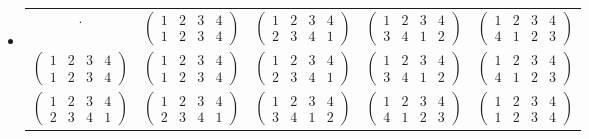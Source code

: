 \documentclass[titlepage]{article}
\newenvironment{problem}[2][Problem]{\begin{trivlist}
\item[\hskip \labelsep {\bfseries #1}\hskip \labelsep {\bfseries #2.}]}{\end{trivlist}}
\begin{document}
\begin{problem}{9}
\begin{itemize}
\item[(a)]  \begin{tabular}{c | c c c c}
    $\cdot$ & $\left(\begin{smallmatrix} 1 & 2 & 3 & 4 \\ 1 & 2 & 3 & 4\end{smallmatrix} \right)$ & $\left(\begin{smallmatrix} 1 & 2 & 3 & 4 \\ 2 & 3 & 4 & 1\end{smallmatrix}\right)$ & $\left(\begin{smallmatrix} 1 & 2 & 3 & 4 \\ 3 & 4 & 1 & 2\end{smallmatrix}\right)$ & $\left(\begin{smallmatrix} 1 & 2 & 3 & 4 \\ 4 & 1 & 2 & 3 \end{smallmatrix} \right)$ \\
    \cline{1-5}
    $\left(\begin{smallmatrix} 1 & 2 & 3 & 4 \\ 1 & 2 & 3 & 4\end{smallmatrix} \right)$ & $\left(\begin{smallmatrix} 1 & 2 & 3 & 4 \\ 1 & 2 & 3 & 4\end{smallmatrix} \right)$ & $\left(\begin{smallmatrix} 1 & 2 & 3 & 4 \\ 2 & 3 & 4 & 1\end{smallmatrix}\right)$ & $\left(\begin{smallmatrix} 1 & 2 & 3 & 4 \\ 3 & 4 & 1 & 2\end{smallmatrix}\right)$ & $\left(\begin{smallmatrix} 1 & 2 & 3 & 4 \\ 4 & 1 & 2 & 3 \end{smallmatrix} \right)$ \\
    $\left(\begin{smallmatrix} 1 & 2 & 3 & 4 \\ 2 & 3 & 4 & 1\end{smallmatrix}\right)$ & $\left(\begin{smallmatrix} 1 & 2 & 3 & 4 \\ 2 & 3 & 4 & 1\end{smallmatrix}\right)$ & $\left(\begin{smallmatrix} 1 & 2 & 3 & 4 \\ 3 & 4 & 1 & 2\end{smallmatrix}\right)$ &  $\left(\begin{smallmatrix} 1 & 2 & 3 & 4 \\ 4 & 1 & 2 & 3 \end{smallmatrix} \right)$ & $\left(\begin{smallmatrix} 1 & 2 & 3 & 4 \\ 1 & 2 & 3 & 4\end{smallmatrix} \right)$ \\

\end{tabular}
\end{itemize}
\end{problem}
\end{document}
